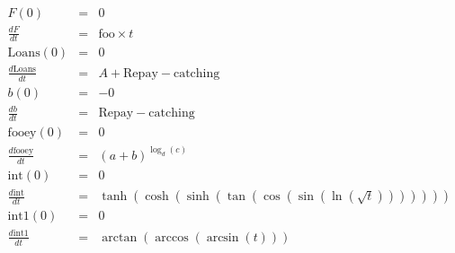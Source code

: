\documentclass{article}
\begin{document}
\begin{eqnarray*}
F(0)&=&0\\
\frac{ d F}{dt} &=&\mathrm{foo}\times  t \\
\mathrm{Loans}(0)&=&0\\
\frac{ d \mathrm{Loans}}{dt} &=&A+\mathrm{Repay}-\mathrm{catching}\\
b(0)&=&-0\\
\frac{ d b}{dt} &=&\mathrm{Repay}-\mathrm{catching}\\
\mathrm{fooey}(0)&=&0\\
\frac{ d \mathrm{fooey}}{dt} &=&\left(a+b\right)^{\log_{d}\left(c\right)}\\
\mathrm{int}(0)&=&0\\
\frac{ d \mathrm{int}}{dt} &=&\tanh\left(\cosh\left(\sinh\left(\tan\left(\cos\left(\sin\left(\ln\left(\sqrt{ t }\right)\right)\right)\right)\right)\right)\right)\\
\mathrm{int1}(0)&=&0\\
\frac{ d \mathrm{int1}}{dt} &=&\arctan\left(\arccos\left(\arcsin\left( t \right)\right)\right)\\
\end{eqnarray*}
\end{document}
